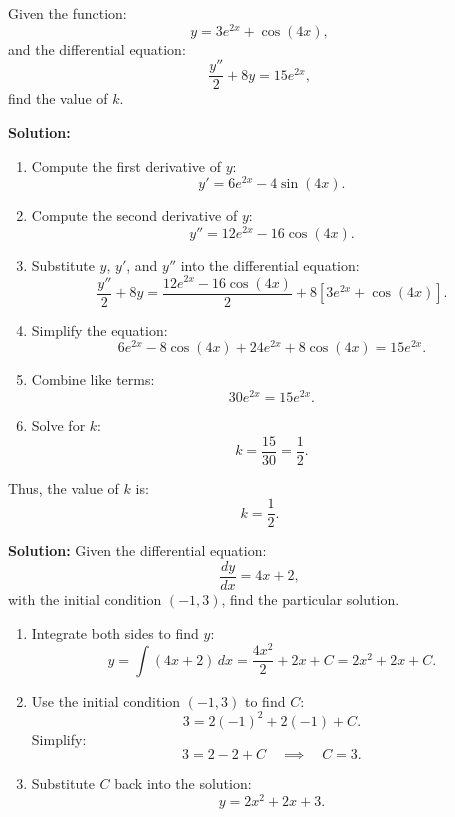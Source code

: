 \documentclass[12pt]{article}
\theoremstyle{beautifulthm}
\begin{document}
\begin{tcolorbox}[colback=examplebg, colframe=red!75!black, title=\textbf{EXAMPLE 2: Verifying the Solution}, fonttitle=\bfseries, sharp corners]

Given the function:
\[
y = 3e^{2x} + \cos(4x),
\]
and the differential equation:
\[
\frac{y''}{2} + 8y = 15e^{2x},
\]
find the value of \(k\).


\tcblower
\textbf{Solution:} 
\begin{enumerate}
    \item Compute the first derivative of \(y\):
    \[
    y' = 6e^{2x} - 4\sin(4x).
    \]
    \item Compute the second derivative of \(y\):
    \[
    y'' = 12e^{2x} - 16\cos(4x).
    \]
    \item Substitute \(y\), \(y'\), and \(y''\) into the differential equation:
    \[
    \frac{y''}{2} + 8y = \frac{12e^{2x} - 16\cos(4x)}{2} + 8[3e^{2x} + \cos(4x)].
    \]
    \item Simplify the equation:
    \[
    6e^{2x} - 8\cos(4x) + 24e^{2x} + 8\cos(4x) = 15e^{2x}.
    \]
    \item Combine like terms:
    \[
    30e^{2x} = 15e^{2x}.
    \]
    \item Solve for \(k\):
    \[
    k = \frac{15}{30} = \frac{1}{2}.
    \]
\end{enumerate}

Thus, the value of \(k\) is:
\[
k = \frac{1}{2}.
\]
\end{tcolorbox}




\begin{tcolorbox}[colback=examplebg, colframe=red!75!black, title=\textbf{EXAMPLE 3: Verifying the Solution}, fonttitle=\bfseries, sharp corners]



\tcblower
\textbf{Solution:} 
Given the differential equation:
\[
\frac{dy}{dx} = 4x + 2,
\]
with the initial condition \((-1, 3)\), find the particular solution.
\end{tcolorbox}
\begin{enumerate}
    \item Integrate both sides to find \(y\):
    \[
    y = \int (4x + 2) \, dx = \frac{4x^2}{2} + 2x + C = 2x^2 + 2x + C.
    \]
    \item Use the initial condition \((-1, 3)\) to find \(C\):
    \[
    3 = 2(-1)^2 + 2(-1) + C.
    \]
    Simplify:
    \[
    3 = 2 - 2 + C \quad \implies \quad C = 3.
    \]
    \item Substitute \(C\) back into the solution:
    \[
    y = 2x^2 + 2x + 3.
    \]
\end{enumerate}
\end{document}
